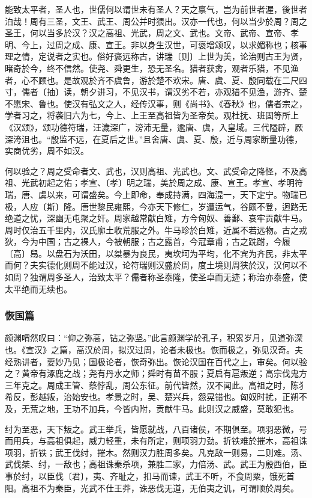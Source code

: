 \documentclass[]{article}
\begin{document}
能致太平者，圣人也，世儒何以谓世未有圣人？天之禀气，岂为前世者渥，後世者泊哉！周有三圣，文王、武王、周公并时猥出。汉亦一代也，何以当少於周？周之圣王，何以当多於汉？汉之高祖、光武，周之文、武也。文帝、武帝、宣帝、孝明、今上，过周之成、康、宣王。非以身生汉世，可褒增颂叹，以求媚称也；核事理之情，定说者之实也。俗好褒远称古，讲瑞〔则〕上世为美，论治则古王为贤，睹奇於今，终不信然。使尧、舜更生，恐无圣名。猎者获禽，观者乐猎，不见渔者，心不顾也。是故观於齐不虞鲁，游於楚不欢宋。唐、虞、夏、殷同载在二尺四寸，儒者〔抽〕读，朝夕讲习，不见汉书，谓汉劣不若，亦观猎不见渔，游齐、楚不愿宋、鲁也。使汉有弘文之人，经传汉事，则《尚书》、《春秋》也，儒者宗之，学者习之，将袭旧六为七，今上、上王至高祖皆为圣帝矣。观杜抚、班固等所上《汉颂》，颂功德符瑞，汪濊深广，滂沛无量，逾唐、虞，入皇域。三代隘辟，厥深洿沮也。``殷监不远，在夏后之世。''且舍唐、虞、夏、殷，近与周家断量功德，实商优劣，周不如汉。

何以验之？周之受命者文、武也，汉则高祖、光武也。文、武受命之降怪，不及高祖、光武初起之佑；孝宣、〔孝〕明之瑞，美於周之成、康、宣王。孝宣、孝明符瑞，唐、虞以来，可谓盛矣。今上即命，奉成持满，四海混一，天下定宁。物瑞已极，人应〔斯〕隆。唐世黎民雍熙，今亦天下修仁，岁遭运气，谷颇不登，迥路无绝道之忧，深幽无屯聚之奸。周家越常献白雉，方今匈奴、善鄯、哀牢贡献牛马。周时仅治五千里内，汉氏廓土收荒服之外。牛马珍於白雉，近属不若远物。古之戎狄，今为中国；古之裸人，今被朝服；古之露首，今冠章甫；古之跣跗，今履〔高〕舄。以盘石为沃田，以桀暴为良民，夷坎坷为平均，化不宾为齐民，非太平而何？夫实德化则周不能过汉，论符瑞则汉盛於周，度土境则周狭於汉，汉何以不如周？独谓周多圣人，治致太平？儒者称圣泰隆，使圣卓而无迹；称治亦泰盛，使太平绝而无续也。

\hypertarget{header-n780}{%
\subsubsection{恢国篇}\label{header-n780}}

颜渊喟然叹曰：``仰之弥高，钻之弥坚。''此言颜渊学於孔子，积累岁月，见道弥深也。《宣汉》之篇，高汉於周，拟汉过周，论者未极也。恢而极之，弥见汉奇。夫经熟讲者，要妙乃见；国极论者，恢奇弥出。恢论汉国在百代之上，审矣。何以验之？黄帝有涿鹿之战；尧有丹水之师；舜时有苗不服；夏启有扈叛逆；高宗伐鬼方三年克之。周成王管、蔡悖乱，周公东征。前代皆然，汉不闻此。高祖之时，陈犭希反，彭越叛，治始安也。孝景之时，吴、楚兴兵，怨晃错也。匈奴时扰，正朔不及，无荒之地，王功不加兵，今皆内附，贡献牛马。此则汉之威盛，莫敢犯也。

纣为至恶，天下叛之。武王举兵，皆愿就战，八百诸侯，不期俱至。项羽恶微，号而用兵，与高祖俱起，威力轻重，未有所定，则项羽力劲。折铁难於摧木，高祖诛项羽，折铁；武王伐纣，摧木。然则汉力胜周多矣。凡克敌一则易，二则难。汤、武伐桀、纣，一敌也；高祖诛秦杀项，兼胜二家，力倍汤、武。武王为殷西伯，臣事於纣，以臣伐〔君〕，夷、齐耻之，扣马而谏，武王不听，不食周粟，饿死首阳。高祖不为秦臣，光武不仕王莽，诛恶伐无道，无伯夷之讥，可谓顺於周矣。
\end{document}
